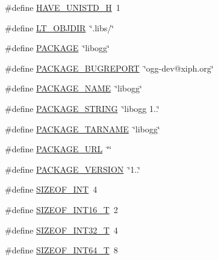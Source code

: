 \begin{DoxyCompactItemize}
\#define \hyperlink{mac_2config_2i386_2lib-src_2libogg_2config_8h_a219b06937831d0da94d801ab13987639}{H\+A\+V\+E\+\_\+\+U\+N\+I\+S\+T\+D\+\_\+H}~1
\item 
\#define \hyperlink{mac_2config_2i386_2lib-src_2libogg_2config_8h_ac2d5925d76379847dd9fc4747b061659}{L\+T\+\_\+\+O\+B\+J\+D\+IR}~\char`\"{}.libs/\char`\"{}
\item 
\#define \hyperlink{mac_2config_2i386_2lib-src_2libogg_2config_8h_aca8570fb706c81df371b7f9bc454ae03}{P\+A\+C\+K\+A\+GE}~\char`\"{}libogg\char`\"{}
\item 
\#define \hyperlink{mac_2config_2i386_2lib-src_2libogg_2config_8h_a1d1d2d7f8d2f95b376954d649ab03233}{P\+A\+C\+K\+A\+G\+E\+\_\+\+B\+U\+G\+R\+E\+P\+O\+RT}~\char`\"{}ogg-\/dev@xiph.\+org\char`\"{}
\item 
\#define \hyperlink{mac_2config_2i386_2lib-src_2libogg_2config_8h_a1c0439e4355794c09b64274849eb0279}{P\+A\+C\+K\+A\+G\+E\+\_\+\+N\+A\+ME}~\char`\"{}libogg\char`\"{}
\item 
\#define \hyperlink{mac_2config_2i386_2lib-src_2libogg_2config_8h_ac73e6f903c16eca7710f92e36e1c6fbf}{P\+A\+C\+K\+A\+G\+E\+\_\+\+S\+T\+R\+I\+NG}~\char`\"{}libogg 1..\char`\"{}
\item 
\#define \hyperlink{mac_2config_2i386_2lib-src_2libogg_2config_8h_af415af6bfede0e8d5453708afe68651c}{P\+A\+C\+K\+A\+G\+E\+\_\+\+T\+A\+R\+N\+A\+ME}~\char`\"{}libogg\char`\"{}
\item 
\#define \hyperlink{mac_2config_2i386_2lib-src_2libogg_2config_8h_a5c93853116d5a50307b6744f147840aa}{P\+A\+C\+K\+A\+G\+E\+\_\+\+U\+RL}~\char`\"{}\char`\"{}
\item 
\#define \hyperlink{mac_2config_2i386_2lib-src_2libogg_2config_8h_aa326a05d5e30f9e9a4bb0b4469d5d0c0}{P\+A\+C\+K\+A\+G\+E\+\_\+\+V\+E\+R\+S\+I\+ON}~\char`\"{}1..\char`\"{}
\item 
\#define \hyperlink{mac_2config_2i386_2lib-src_2libogg_2config_8h_a44184cf844a916eee78598ab35fc966b}{S\+I\+Z\+E\+O\+F\+\_\+\+I\+NT}~4
\item 
\#define \hyperlink{mac_2config_2i386_2lib-src_2libogg_2config_8h_ab15d8c88fe9c0798898c85f9a9caf116}{S\+I\+Z\+E\+O\+F\+\_\+\+I\+N\+T16\+\_\+T}~2
\item 
\#define \hyperlink{mac_2config_2i386_2lib-src_2libogg_2config_8h_acfcb68dfce5219704273a77015ef3f62}{S\+I\+Z\+E\+O\+F\+\_\+\+I\+N\+T32\+\_\+T}~4
\item 
\#define \hyperlink{mac_2config_2i386_2lib-src_2libogg_2config_8h_a9ff3f52037bd863890b862d86fb9b6cf}{S\+I\+Z\+E\+O\+F\+\_\+\+I\+N\+T64\+\_\+T}~8

\end{DoxyCompactItemize}

